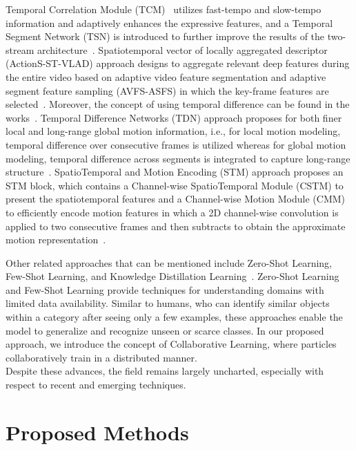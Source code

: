 \documentclass[fleqn,10pt]{wlscirep}
\begin{document}
Temporal Correlation Module (TCM)~\cite{liu2022motion} utilizes fast-tempo and slow-tempo information and adaptively enhances the expressive features, and a Temporal Segment Network (TSN) is introduced to further improve the results of the two-stream architecture~\cite{wang2016temporal}. Spatiotemporal vector of locally aggregated descriptor (ActionS-ST-VLAD) approach designs to aggregate relevant deep features during the entire video based on adaptive video feature segmentation and adaptive segment feature sampling (AVFS-ASFS) in which the key-frame features are selected~\cite{tu2019action}. Moreover, the concept of using temporal difference can be found in the works~\cite{wang2021tdn,jiang2019stm,phong2018action}. Temporal Difference Networks (TDN) approach proposes for both finer local and long-range global motion information, i.e., for local motion modeling, temporal difference over consecutive frames is utilized whereas for global motion modeling, temporal difference across segments is integrated to capture long-range structure~\cite{wang2021tdn}. SpatioTemporal and Motion Encoding (STM) approach proposes an STM block, which contains a Channel-wise SpatioTemporal Module (CSTM) to present the spatiotemporal features and a Channel-wise Motion Module (CMM) to efficiently encode motion features in which a 2D channel-wise convolution is applied to two consecutive frames and then subtracts to obtain the approximate motion representation~\cite{jiang2019stm}. 

Other related approaches that can be mentioned include Zero-Shot Learning, Few-Shot Learning, and Knowledge Distillation Learning~\cite{zhang2022tn,gao2020pairwise,tu2022general}. Zero-Shot Learning and Few-Shot Learning provide techniques for understanding domains with limited data availability. Similar to humans, who can identify similar objects within a category after seeing only a few examples, these approaches enable the model to generalize and recognize unseen or scarce classes. In our proposed approach, we introduce the concept of Collaborative Learning, where particles collaboratively train in a distributed manner.\\

Despite these advances, the field remains largely uncharted, especially with respect to recent and emerging techniques.



 
 
\section{Proposed Methods}
\label{sec:proposed}
\end{document}
